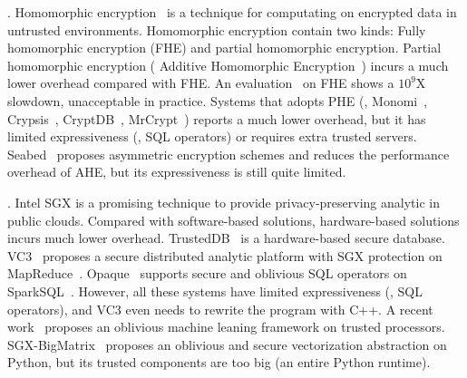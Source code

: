 . Homomorphic 
encryption~\cite{fullmomo:stoc09} is a
technique for computating on encrypted data in untrusted 
environments. Homomorphic encryption contain two kinds: Fully 
homomorphic encryption (FHE) and partial 
homomorphic encryption.
Partial homomorphic encryption (\eg{} Additive Homomorphic 
Encryption~\cite{paillier})
incurs a much lower overhead compared with FHE. An evaluation~\cite{homo:eval} 
on
FHE shows a $10^9$X slowdown, unacceptable in practice.
Systems that adopts PHE (\eg, Monomi~\cite{monomi:vldb13},
Crypsis~\cite{crypsis:hotcloud14}, CryptDB~\cite{cryptdb:sosp11},
MrCrypt~\cite{mrcrypt:oospsla14})
reports a much lower overhead, but it has limited expressiveness
(\eg, SQL operators) or requires extra trusted 
servers. Seabed~\cite{seabed:osdi16} proposes asymmetric encryption schemes and 
reduces the performance overhead of AHE, but its expressiveness is still quite
limited.

. Intel SGX is a promising technique 
to provide privacy-preserving analytic in public clouds. Compared with 
software-based solutions, hardware-based solutions incurs much lower overhead. 
TrustedDB~\cite{trusteddb:sigmod11} is a hardware-based secure database.
VC3~\cite{vc3:sp15} proposes a secure distributed analytic platform
with SGX protection on MapReduce~\cite{mapreduce}. 
Opaque~\cite{opaque:nsdi17} supports secure and oblivious SQL operators on 
SparkSQL~\cite{sparksql:sigmod15}. However, all these systems have limited 
expressiveness (\eg, SQL operators), and VC3 even needs to rewrite the program 
with C++. A recent work~\cite{oblivious:security16} proposes an oblivious 
machine leaning framework on trusted processors. 
SGX-BigMatrix~\cite{bigmatrix:ccs17} proposes an oblivious and secure 
vectorization abstraction on Python, but its trusted components are too big (an 
entire Python runtime).


